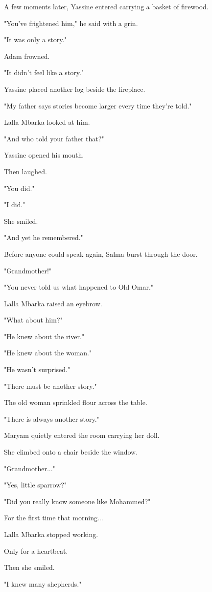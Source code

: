 \documentclass[12pt,openany]{book}
\begin{document}
A few moments later, Yassine entered carrying a basket of firewood.

"You've frightened him," he said with a grin.

"It was only a story."

Adam frowned.

"It didn't feel like a story."

Yassine placed another log beside the fireplace.

"My father says stories become larger every time they're told."

Lalla Mbarka looked at him.

"And who told your father that?"

Yassine opened his mouth.

Then laughed.

"You did."

"I did."

She smiled.

"And yet he remembered."

Before anyone could speak again, Salma burst through the door.

"Grandmother!"

"You never told us what happened to Old Omar."

Lalla Mbarka raised an eyebrow.

"What about him?"

"He knew about the river."

"He knew about the woman."

"He wasn't surprised."

"There must be another story."

The old woman sprinkled flour across the table.

"There is always another story."

Maryam quietly entered the room carrying her doll.

She climbed onto a chair beside the window.

"Grandmother..."

"Yes, little sparrow?"

"Did you really know someone like Mohammed?"

For the first time that morning...

Lalla Mbarka stopped working.

Only for a heartbeat.

Then she smiled.

"I knew many shepherds."
\end{document}
